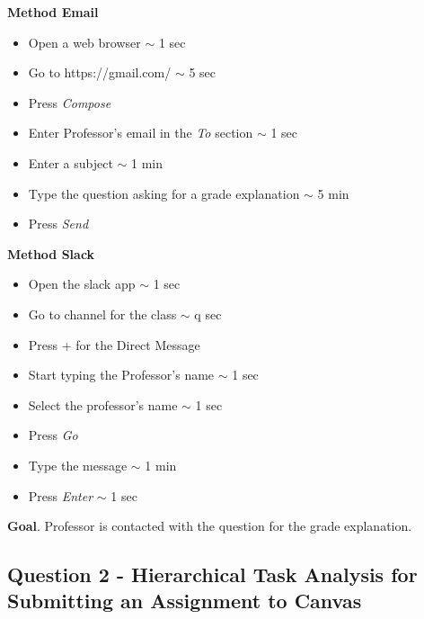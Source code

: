 \documentclass[12pt,letterpaper]{article}
\begin{document}
\textbf{Method Email}

\begin{itemize}
    \itemsep-0.2em 
    \item Open a web browser  $\sim$ 1 sec
    \item Go to https://gmail.com/ $\sim$ 5 sec 
    \item Press \textit{Compose}
    \item Enter Professor's email in the \textit{To} section $\sim$ 1 sec
    \item Enter a subject $\sim$ 1 min
    \item Type the question asking for a grade explanation $\sim$ 5 min
    \item Press \textit{Send}
\end{itemize}

\textbf{Method Slack}

\begin{itemize}
    \itemsep-0.2em 
    \item Open the slack app  $\sim$ 1 sec
    \item Go to channel for the class $\sim$ q sec 
    \item Press + for the Direct Message
    \item Start typing the Professor's name $\sim$ 1 sec
    \item Select the professor's name $\sim$ 1 sec
    \item Press \textit{Go}
    \item Type the message $\sim$ 1 min
    \item Press \textit{Enter} $\sim$ 1 sec
\end{itemize}

\textbf{Goal}. Professor is contacted with the question for the grade explanation.

\subsection*{Question 2 - Hierarchical Task Analysis for Submitting an Assignment to Canvas}
\end{document}
